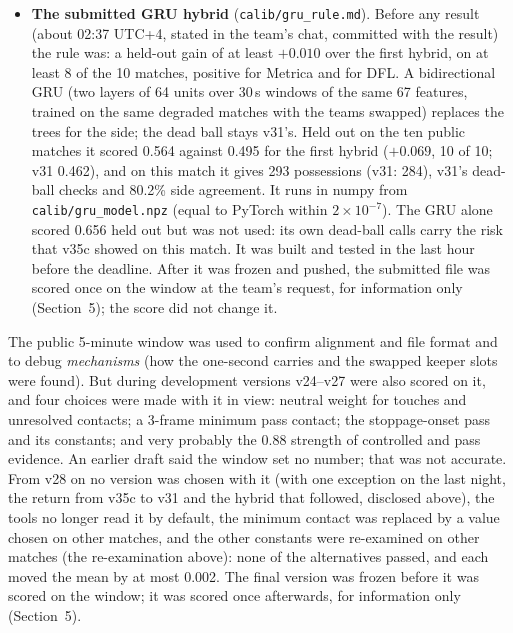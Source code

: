 \documentclass[11pt,a4paper]{article}
\newcommand{\code}[1]{\texttt{#1}}
\newcommand{\st}[1]{\textbf{#1}}
\begin{document}
\begin{itemize}
possessions (v31: 284) and v31's dead-ball checks (Section~5). It passed every condition of its rule. The idea came after v35c's window score showed weak dead-ball timing; we disclose
that. The hybrid itself was never scored on the window.
\item \st{The submitted GRU hybrid} (\code{calib/gru\_rule.md}). Before any result (about 02:37 UTC+4, stated
in the team's chat, committed with the result) the rule was: a held-out gain of at least $+0.010$ over the first
hybrid, on at least 8 of the 10 matches, positive for Metrica and for DFL. A bidirectional GRU (two layers of 64
units over 30\,s windows of the same 67 features, trained on the same degraded matches with the teams
swapped) replaces the trees for the side; the dead ball stays v31's. Held out on the ten public matches it scored
0.564 against 0.495 for the first hybrid ($+0.069$, 10 of 10; v31 0.462), and on this match it gives 293
possessions (v31: 284), v31's dead-ball checks and 80.2\% side agreement. It runs in numpy from
\code{calib/gru\_model.npz} (equal to PyTorch within $2\times10^{-7}$). The GRU alone scored 0.656 held out
but was not used: its own dead-ball calls carry the risk that v35c showed on this match. It was built and
tested in the last hour before the deadline. After it was frozen and pushed, the submitted file was scored once on
the window at the team's request, for information only (Section~5); the score did not change it.
\end{itemize}

The public 5-minute window was used to confirm alignment and file format and
to debug \emph{mechanisms} (how the one-second carries and the swapped keeper slots were found). But
during development versions v24--v27 were also scored on it, and four choices were made with it in
view: neutral weight for touches and unresolved contacts; a 3-frame minimum pass contact; the
stoppage-onset pass and its constants; and very probably the 0.88 strength of controlled and pass
evidence. An earlier draft said the window set no number; that was not accurate. From v28 on no
version was chosen with it (with one exception on the last night, the return
from v35c to v31 and the hybrid that followed, disclosed above), the tools no longer read it by default, the minimum contact was replaced
by a value chosen on other matches, and the other constants were re-examined on other matches (the
re-examination above): none of the alternatives passed, and each moved the mean by at most 0.002.
The final version was frozen before it was scored on the window; it was scored once afterwards, for
information only (Section~5).
\end{document}
